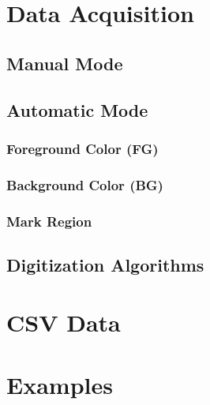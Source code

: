 \documentclass[letterpaper, 10pt]{article}
\begin{document}
\section{Data Acquisition}
\subsection{Manual Mode}
\subsection{Automatic Mode}
\subsubsection{Foreground Color (FG)}
\subsubsection{Background Color (BG)}
\subsubsection{Mark Region}
\subsection{Digitization Algorithms}
\section{CSV Data}

\section{Examples}
\end{document}
